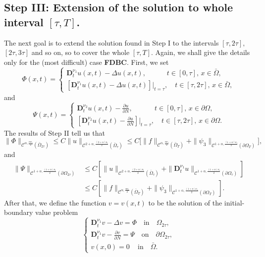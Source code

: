 \documentclass[reqno]{amsart}
\def\C {\mathcal{C}}
\theoremstyle{definition}
\numberwithin{equation}{section}
\begin{document}
\subsection{Step III: Extension of the solution to whole interval $[\tau,T]$.}\label{s5.3}
The next goal is to extend the solution found
in Step I to the intervals $[\tau,2\tau],$ $[2\tau, 3\tau]$ and so on, so to cover the whole
$[\tau,T]$.
Again, we shall give the details only for the (most difficult) case \textbf{FDBC}.
First, we set
\[
\Phi(x,t)=
\begin{cases}
\mathbf{D}_{t}^{\nu_{1}}u(x,t)-\Delta u(x,t),\qquad\quad t\in[0,\tau],\,x\in\bar{\Omega},\\
[\mathbf{D}_{t}^{\nu_{1}}u(x,t)-\Delta u(x,t)]|_{t=\tau},\quad t\in[\tau,2\tau],\,x\in\bar{\Omega},
\end{cases}
\]
and
\[
\Psi(x,t)=
\begin{cases}
\mathbf{D}_{t}^{\nu_{2}}u(x,t)-\frac{\partial u}{\partial N},\qquad\quad\, t\in[0,\tau],\,x\in\partial\Omega,\\
[\mathbf{D}_{t}^{\nu_{2}}u(x,t)-\frac{\partial u}{\partial N}]|_{t=\tau},\quad t\in[\tau,2\tau],\,x\in\partial\Omega.
\end{cases}
\]
The results of Step II tell us that
$$\|\Phi\|_{\C^{\alpha,\frac{\alpha\nu_{1}}{2}}(\bar{\Omega}_{2\tau})}\leq C\|u\|_{\C^{2+\alpha,\frac{(2+\alpha)\nu_{1}}{2}}(\bar{\Omega}_{\tau})}
\leq C\big[\|f\|_{\C^{\alpha,\frac{\alpha\nu_{1}}{2}}(\bar{\Omega}_{T})}
+\|\psi_3\|_{\C^{1+\alpha,\frac{(1+\alpha)\nu_{1}}{2}}(\partial\Omega_{T})}\big],$$
and
\begin{align*}
\|\Psi\|_{\C^{1+\alpha,\frac{(1+\alpha)\nu_{1}}{2}}(\partial\Omega_{2\tau})}&\leq C[\|u\|_{\C^{2+\alpha,\frac{(2+\alpha)\nu_{1}}{2}}(\bar{\Omega}_{\tau})}+\|\mathbf{D}_{t}^{\nu_{1}}u\|_{\C^{1+\alpha,\frac{(1+\alpha)\nu_{1}}{2}}(\partial\Omega_{\tau})}]
\\
&
\leq C[\|f\|_{\C^{\alpha,\frac{\alpha\nu_{1}}{2}}(\bar{\Omega}_{T})}
+\|\psi_3\|_{\C^{1+\alpha,\frac{(1+\alpha)\nu_{1}}{2}}(\partial\Omega_{T})}
].
\end{align*}
After that, we define the function $v=v(x,t)$ to be the solution of the initial-boundary value problem
\begin{equation}\label{5.8}
\begin{cases}
\mathbf{D}_{t}^{\nu_{1}}v-\Delta v=\Phi\quad \text{in}\quad\Omega_{2\tau},\\
\mathbf{D}_{t}^{\nu_{1}}v-\frac{\partial v}{\partial N}=\Psi\quad\text{on}\quad\partial\Omega_{2\tau},\\
v(x,0)=0\quad\,\text{in}\quad\bar{\Omega}.
\end{cases}
\end{equation}
\end{document}
